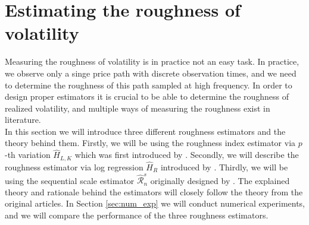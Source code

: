\documentclass{article}
\begin{document}
\section{Estimating the roughness of volatility} \label{sec:intro_est}
Measuring the roughness of volatility is in practice not an easy task. 
In practice, we observe only a singe price path with discrete observation times, and we need to determine the roughness of this path sampled at high frequency. In order to design proper estimators it is crucial to be able to determine the roughness of realized volatility, and multiple ways of measuring the roughness exist in literature.\\
In this section we will introduce three different roughness estimators and the theory behind them. Firstly, we will be using the roughness index estimator via $p$-th variation $\widehat{H}_{L,K}$ which was first introduced by \cite{cont}. Secondly, we will describe the roughness estimator via log regression $\widehat{H}_{R}$ introduced by \cite{gatheral}. Thirdly, we will be using the sequential scale estimator $\widehat{\mathscr{R}}_n^s$ originally designed by \cite{han}. The explained theory and rationale behind the estimators will closely follow the theory from the original articles. In Section \ref{sec:num_exp} we will conduct numerical experiments, and we will compare the performance of the three roughness estimators. 
\end{document}

